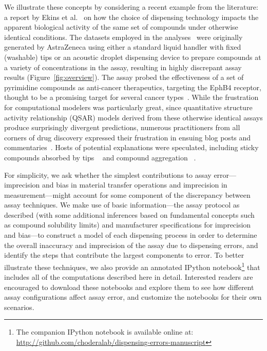 \documentclass[aps,pre,twocolumn,nofootinbib,superscriptaddress,linenumbers]{revtex4-1}
\begin{document}
We illustrate these concepts by considering a recent example from the literature: a report by Ekins et al.~\cite{ekins_dispensing_2013} on how the choice of dispensing technology impacts the apparent biological activity of the same set of compounds under otherwise identical conditions.
The datasets employed in the analyses~\cite{barlaam_novel_2009,barlaam_pyrimidine_2010} were originally generated by AstraZeneca using either a standard liquid handler with fixed (washable) tips or an acoustic droplet dispensing device to prepare compounds at a variety of concentrations in the assay, resulting in highly discrepant assay results (Figure~\ref{fig:overview}).
The assay probed the effectiveness of a set of pyrimidine compounds as anti-cancer therapeutics, targeting the EphB4 receptor, thought to be a promising target for several cancer types~\cite{xia_ephb4_2005,bardelle_inhibitors_2008}.
While the frustration for computational modelers was particularly great, since quantitative structure activity relationship (QSAR) models derived from these otherwise identical assays produce surprisingly divergent predictions, numerous practitioners from all corners of drug discovery expressed their frustration in ensuing blog posts and commentaries~\cite{lowe_drug_2015,evanko_serial_2013,ekins_what_2013}.
Hosts of potential explanations were speculated, including sticky compounds absorbed by tips ~\cite{palmgren_drug_2006} and compound aggregation ~\cite{feng_synergy_2006,feng_high-throughput_2005}.

For simplicity, we ask whether the simplest contributions to assay error---imprecision and bias in material transfer operations and imprecision in measurement---might account for some component of the discrepancy between assay techniques.
We make use of basic information---the assay protocol as described (with some additional inferences based on fundamental concepts such as compound solubility limits) and manufacturer specifications for imprecision and bias---to construct a model of each dispensing process in order to determine the overall inaccuracy and imprecision of the assay due to dispensing errors, and identify the steps that contribute the largest components to error.
To better illustrate these techniques, we also provide an annotated IPython notebook\footnote{The companion IPython notebook is available online at: \url{http://github.com/choderalab/dispensing-errors-manuscript}} that includes all of the computations described here in detail.
Interested readers are encouraged to download these notebooks and explore them to see how different assay configurations affect assay error, and customize the notebooks for their own scenarios.
\end{document}
